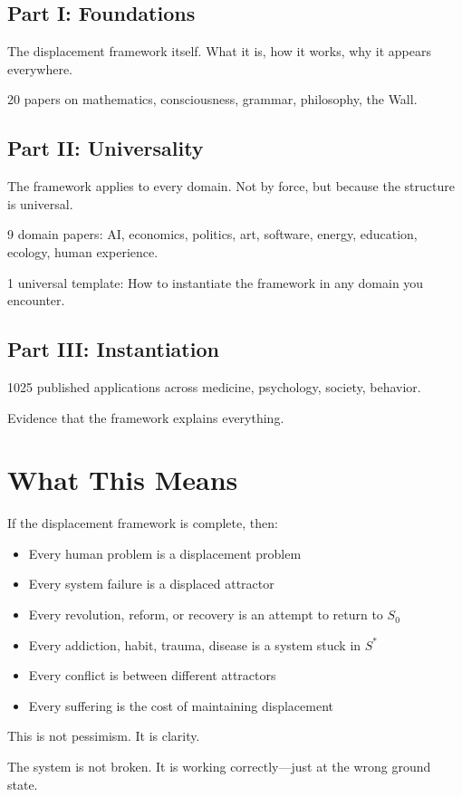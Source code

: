 \documentclass[12pt]{article}
\begin{document}
\subsection*{Part I: Foundations}
The displacement framework itself. What it is, how it works, why it appears everywhere.

20 papers on mathematics, consciousness, grammar, philosophy, the Wall.

\subsection*{Part II: Universality}
The framework applies to every domain. Not by force, but because the structure is universal.

9 domain papers: AI, economics, politics, art, software, energy, education, ecology, human experience.

1 universal template: How to instantiate the framework in any domain you encounter.

\subsection*{Part III: Instantiation}
1025 published applications across medicine, psychology, society, behavior.

Evidence that the framework explains everything.

\section*{What This Means}

If the displacement framework is complete, then:

\begin{itemize}
\item Every human problem is a displacement problem
\item Every system failure is a displaced attractor
\item Every revolution, reform, or recovery is an attempt to return to $S_0$
\item Every addiction, habit, trauma, disease is a system stuck in $S^*$
\item Every conflict is between different attractors
\item Every suffering is the cost of maintaining displacement
\end{itemize}

This is not pessimism. It is clarity.

The system is not broken. It is working correctly—just at the wrong ground state.
\end{document}
